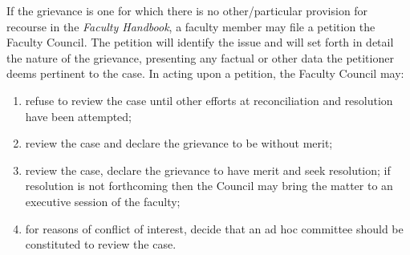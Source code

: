 		If the grievance is one for which there is no other/particular
		provision for recourse in the \emph{Faculty Handbook}, a faculty
		member may file a petition the Faculty Council.  The petition will
		identify the issue and will set forth in detail the nature of the
		grievance, presenting any factual or other data the petitioner deems
		pertinent to the case.  In acting upon a petition, the Faculty
		Council may:

		\begin{enumerate}[label=\alph*)]
			\item{refuse to review the case until other efforts at reconciliation and resolution have been attempted;
			}
			\item{review the case and declare the grievance to be without merit;
			}
			\item{review the case, declare the grievance to have merit and seek resolution; if resolution is not forthcoming then the Council may bring the matter to an executive session of the faculty;
			}
			\item{for reasons of conflict of interest, decide that an ad hoc committee should be constituted to review the case.
			}
		\end{enumerate}

